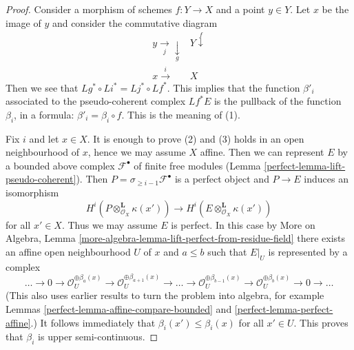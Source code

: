 \begin{proof}

Consider a morphism of schemes $f : Y \to X$ and a point $y \in Y$.
Let $x$ be the image of $y$ and consider the commutative diagram
$$
\begin{array}{cc}y \underset{j}{\longrightarrow}\underset{g}{\downarrow} & Y \overset{f}{\downarrow} \\ x \overset{i}{\longrightarrow} & X\end{array}
$$
Then we see that $Lg^* \circ Li^* = Lj^* \circ Lf^*$. This implies that
the function $\beta'_i$ associated to the pseudo-coherent complex $Lf^*E$
is the pullback of the function $\beta_i$, in a formula:
$\beta'_i = \beta_i \circ f$. This is the meaning of (1).

\medskip\noindent
Fix $i$ and let $x \in X$. It is enough to prove (2) and (3)
holds in an open neighbourhood of $x$, hence we may assume $X$ affine.
Then we can represent $E$ by a bounded above complex $\mathcal{F}^\bullet$
of finite free modules (Lemma \ref{perfect-lemma-lift-pseudo-coherent}).
Then $P = \sigma_{\geq i - 1}\mathcal{F}^\bullet$ is a perfect object
and $P \to E$ induces an isomorphism
$$
H^i(P \otimes_{\mathcal{O}_X}^\mathbf{L} \kappa(x')) \to
H^i(E \otimes_{\mathcal{O}_X}^\mathbf{L} \kappa(x'))
$$
for all $x' \in X$. Thus we may assume $E$ is perfect. In this case
by More on Algebra, Lemma
\ref{more-algebra-lemma-lift-perfect-from-residue-field}
there exists an affine open neighbourhood $U$ of $x$ and
$a \leq b$ such that $E|_U$ is represented by a complex
$$
\ldots \to 0 \to \mathcal{O}_U^{\oplus \beta_a(x)}
\to \mathcal{O}_U^{\oplus \beta_{a + 1}(x)} \to
\ldots \to
\mathcal{O}_U^{\oplus \beta_{b - 1}(x)} \to
\mathcal{O}_U^{\oplus \beta_b(x)} \to 0
\to \ldots
$$
(This also uses earlier results to turn the problem into algebra, for example
Lemmas \ref{perfect-lemma-affine-compare-bounded} and
\ref{perfect-lemma-perfect-affine}.)
It follows immediately that $\beta_i(x') \leq \beta_i(x)$
for all $x' \in U$. This proves that $\beta_i$ is upper
semi-continuous.


\end{proof}
